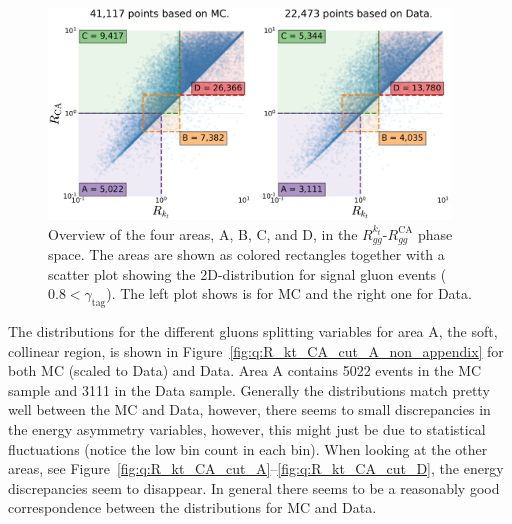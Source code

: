 \begin{figure}[h!]
  \centerfloat
  \includegraphics[width=0.95\textwidth, trim=0 0 0 0, clip]{figures/quarks/gtag-R_kt_CA_overview-down_sample=1.00-ML_vars=vertex-selection=b-ejet_min=4-n_iter_RS_lgb=99-n_iter_RS_xgb=9-cdot_cut=0.90-version=19-njet=4.pdf}
  \caption[Overview of the Four Areas in the $R_{gg}^{k_t}$-$R_{gg}^\mathrm{CA}$ Phase Space]
          {Overview of the four areas, A, B, C, and D, in the $R_{gg}^{k_t}$-$R_{gg}^\mathrm{CA}$ phase space. The areas are shown as colored rectangles together with a scatter plot showing the 2D-distribution for signal gluon events ($0.8 < \gamma_\mathrm{tag}$). The left plot shows is for MC and the right one for Data.} 
  \label{fig:q:R_kt_CA_overview}
\end{figure}

The distributions for the different gluons splitting variables for area A, the soft, collinear region, is shown in Figure~\ref{fig:q:R_kt_CA_cut_A_non_appendix} for both MC (scaled to Data) and Data. Area A contains \num{5022} events in the MC sample and \num{3111} in the Data sample. Generally the distributions match pretty well between the MC and Data, however, there seems to small discrepancies in the energy asymmetry variables, however, this might just be due to statistical fluctuations (notice the low bin count in each bin). When looking at the other areas, see Figure~\ref{fig:q:R_kt_CA_cut_A}--\ref{fig:q:R_kt_CA_cut_D}, the energy discrepancies seem to disappear. In general there seems to be a reasonably good correspondence between the distributions for MC and Data. 

